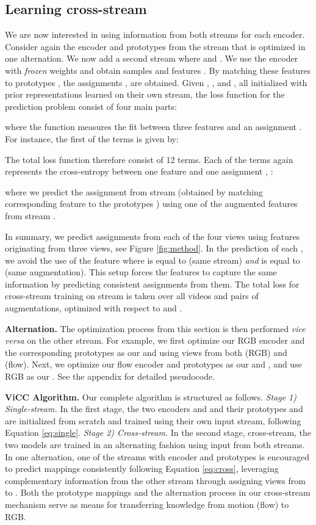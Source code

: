 \documentclass[10pt,twocolumn,letterpaper]{article}
\begin{document}
\subsection{Learning cross-stream}
\label{sec:crossstream}
We are now interested in using information from both streams for each encoder. Consider again the encoder  and prototypes  from the stream  that is optimized in one alternation. We now add a second stream  where  and .  We use the encoder  with \textit{frozen} weights and obtain samples  and features . By matching these features to prototypes , the assignments ,  are obtained. Given ,  , and , all initialized with prior representations learned on their own stream, the loss function for the prediction problem consist of four main parts:

where the function  measures the fit between three features  and an assignment . For instance, the first of the  terms is given by: 

The total loss function therefore consist of 12 terms. Each of the terms  again represents the cross-entropy between one feature  and one assignment , \eg: 

where we predict the assignment  from stream  (obtained by matching corresponding feature  to the prototypes ) using one of the augmented features  from stream . 

In summary, we predict assignments from each of the four views using features originating from three views, see Figure \ref{fig:method}. In the prediction of each , we avoid the use of the feature  where  is equal to  (same stream) \textit{and}  is equal to  (same augmentation). This setup forces the features to capture the same information by predicting consistent assignments from them. The total loss for cross-stream training on stream  is taken over all videos and pairs of augmentations, optimized with respect to  and . 

\textbf{Alternation.} The optimization process from this section is then performed \textit{vice versa} on the other stream. For example, we first optimize our RGB encoder  and the corresponding prototypes  as our  and  using views from both  (RGB) and  (flow). Next, we optimize our flow encoder  and prototypes  as our  and , and use RGB as our . See the appendix for detailed pseudocode.

\textbf{ViCC Algorithm.} Our complete algorithm is structured as follows. \textit{Stage 1) Single-stream.} In the first stage, the two encoders  and  and their prototypes  and  are initialized from scratch and trained using their own input stream, following Equation \ref{eq:single}. \textit{Stage 2) Cross-stream.} In the second stage, cross-stream, the two models are trained in an alternating fashion using input from both streams. In one alternation, one of the streams  with encoder  and prototypes  is encouraged to predict mappings consistently following Equation \ref{eq:cross}, leveraging complementary information from the other stream through assigning views from  to . Both the prototype mappings and the alternation process in our cross-stream mechanism serve as means for transferring knowledge from motion (flow) to RGB. 
\end{document}
